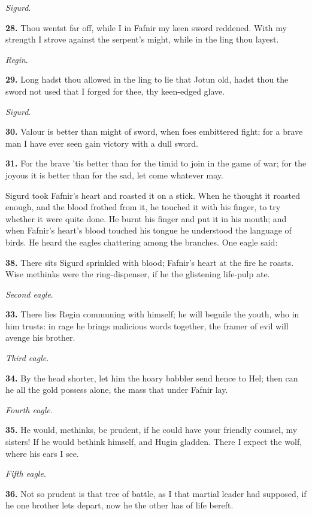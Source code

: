 \emph{Sigurd}.

\textbf{28.} Thou wentst far off, while I in Fafnir my keen sword reddened.
With my strength I strove against the serpent's might, while in the
ling thou layest.

\emph{Regin}.

\textbf{29.} Long hadst thou allowed in the ling to lie that Jotun old, hadst
thou the sword not used that I forged for thee, thy keen-edged glave.

\emph{Sigurd}.

\textbf{30.} Valour is better than might of sword, when foes embittered
fight; for a brave man I have ever seen gain victory with a dull
sword.

\textbf{31.} For the brave 'tis better than for the timid to join in the game
of war; for the joyous it is better than for the sad, let come
whatever may.

Sigurd took Fafnir's heart and roasted it on a stick. When he thought
it roasted enough, and the blood frothed from it, he touched it with
his finger, to try whether it were quite done. He burnt his finger and
put it in his mouth; and when Fafnir's heart's blood touched his
tongue he understood the language of birds. He heard the eagles
chattering among the branches. One eagle said:

\textbf{38.} There sits Sigurd sprinkled with blood; Fafnir's heart at the
fire he roasts. Wise methinks were the ring-dispenser, if he the
glistening life-pulp ate.

\emph{Second eagle}.

\textbf{33.} There lies Regin communing with himself; he will beguile the
youth, who in him trusts: in rage he brings malicious words together,
the framer of evil will avenge his brother.

\emph{Third eagle}.

\textbf{34.} By the head shorter, let him the hoary babbler send hence to
Hel; then can he all the gold possess alone, the mass that under
Fafnir lay.

\emph{Fourth eagle}.

\textbf{35.} He would, methinks, be prudent, if he could have your friendly
counsel, my sisters! If he would bethink himself, and Hugin gladden.
There I expect the wolf, where his ears I see.

\emph{Fifth eagle}.

\textbf{36.} Not so prudent is that tree of battle, as I that martial leader
had supposed, if he one brother lets depart, now he the other has of
life bereft.

